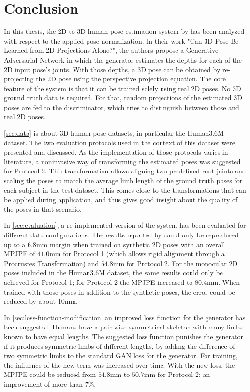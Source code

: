 \section{Conclusion}
\label{sec:conclusion}
In this thesis, the 2D to 3D human pose estimation system by \citet{drover18} has been analyzed with respect to the applied pose normalization.
In their work "Can 3D Pose Be Learned from 2D Projections Alone?", the authors propose a Generative Adversarial Network in which the generator estimates the depths for each of the 2D input pose's joints.
With those depths, a 3D pose can be obtained by re-projecting the 2D pose using the perspective projection equation.
The core feature of the system is that it can be trained solely using real 2D poses.
No 3D ground truth data is required.
For that, random projections of the estimated 3D poses are fed to the discriminator, which tries to distinguish between those and real 2D poses.

\autoref{sec:data} is about 3D human pose datasets, in particular the Human3.6M \cite{ionescu14} dataset.
The two evaluation protocols used in the context of this dataset were presented and discussed.
As the implementation of those protocols varies in literature, a noninvasive way of transforming the estimated poses was suggested for Protocol 2.
This transformation allows aligning two predefined root joints and scaling the poses to match the average limb length of the ground truth poses for each subject in the test dataset.
This comes close to the transformations that can be applied during application, and thus gives good insight about the quality of the poses in that scenario.

In \autoref{sec:evaluation}, a re-implemented version of the system has been evaluated for different data configurations.
The results reported by \citet{drover18} could only be reproduced up to a $6.8$mm margin when trained on synthetic 2D poses with an overall MPJPE of $41.0$mm for Protocol 1 (which allows rigid alignment through a Procrustes Transformation) and $54.8$mm for Protocol 2.
For the monocular 2D poses included in the Human3.6M dataset, the same results could only be achieved for Protocol 1; for Protocol 2 the MPJPE increased to $80.4$mm.
When trained with those poses in addition to the synthetic poses, the error could be reduced by about $10$mm.

In \autoref{sec:loss-function-modification} an improved loss function for the generator has been suggested.
Humans have a pair-wise symmetrical skeleton with many limbs known to have equal lengths.
The suggested loss function punishes the generator if it produces symmetric limbs of different lengths, by adding the difference of two symmetric limbs to the standard GAN loss for the generator.
For training, the influence of the new term was increased over time.
With the new loss, the MPJPE could be reduced from $54.8$mm to $50.7$mm for Protocol 2; an improvement of more than $7\%$.


